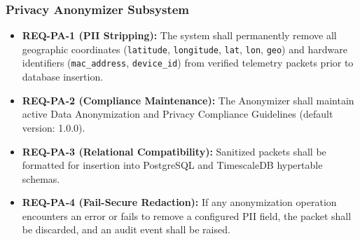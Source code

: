 \subsubsection{Privacy Anonymizer Subsystem}
\begin{itemize}
    \item \textbf{REQ-PA-1 (PII Stripping):} The system shall permanently remove all geographic coordinates (\texttt{latitude}, \texttt{longitude}, \texttt{lat}, \texttt{lon}, \texttt{geo}) and hardware identifiers (\texttt{mac\_address}, \texttt{device\_id}) from verified telemetry packets prior to database insertion.
    \item \textbf{REQ-PA-2 (Compliance Maintenance):} The Anonymizer shall maintain active Data Anonymization and Privacy Compliance Guidelines (default version: 1.0.0).
    \item \textbf{REQ-PA-3 (Relational Compatibility):} Sanitized packets shall be formatted for insertion into PostgreSQL and TimescaleDB hypertable schemas.
    \item \textbf{REQ-PA-4 (Fail-Secure Redaction):} If any anonymization operation encounters an error or fails to remove a configured PII field, the packet shall be discarded, and an audit event shall be raised.
\end{itemize}

